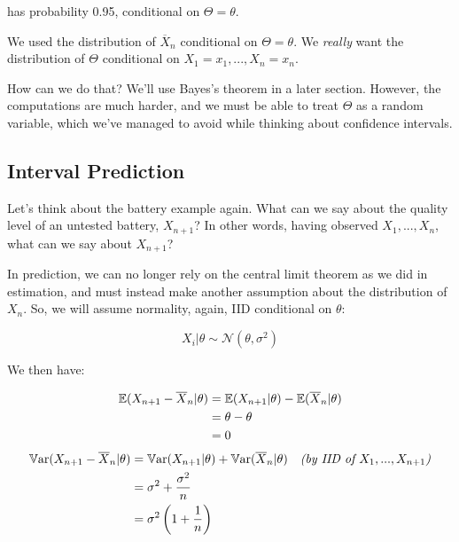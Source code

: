 \documentclass[a4paper]{article}
\begin{document}
                has probability 0.95, conditional on $\Theta = \theta$.

                We used the distribution of $\overline X_n$ conditional on
                $\Theta = \theta$. We \textit{really} want the distribution of
                $\Theta$ conditional on $X_1 = x_1, ..., X_n = x_n$.

                How can we do that? We'll use Bayes's theorem in a later section.
                However, the computations are much harder, and we must be able
                to treat $\Theta$ as a random variable, which we've managed to
                avoid while thinking about confidence intervals.

        \subsection{Interval Prediction}
            \begin{fread}
                [MR03, section 8.6]
            \end{fread}

            Let's think about the battery example again. What can we say about
            the quality level of an untested battery, $X_{n+1}$? In other words,
            having observed $X_1, ..., X_n$, what can we say about $X_{n+1}$?

            In prediction, we can no longer rely on the central limit theorem as
            we did in estimation, and must instead make another assumption about
            the distribution of $X_n$. So, we will assume normality, again, IID
            conditional on $\theta$:

            \[
                X_i | \theta \sim \mathcal{N}(\theta, \sigma^2)
            \]

            We then have:

            \begin{align*}
                \mathbb{E}(X_{n + 1} - \overline X_n | \theta) & = \mathbb{E}(X_{n + 1} |
                    \theta) - \mathbb{E}(\overline X_n | \theta) \\
                & = \theta - \theta \\
                & = 0
            \end{align*}
            \begin{align*}
                \mathbb{V}\text{ar}(X_{n + 1} - \overline X_n | \theta) & = \mathbb{V}\text{ar}(X_{n + 1} |
                    \theta) + \mathbb{V}\text{ar}(\overline X_n | \theta) & \textit{(by IID of
                    $X_1, ..., X_{n+1}$)} \\
                & = \sigma^2 + \frac{\sigma^2}{n} \\
                & = \sigma^2 \left(1 + \frac{1}{n}\right)
            \end{align*}
\end{document}
